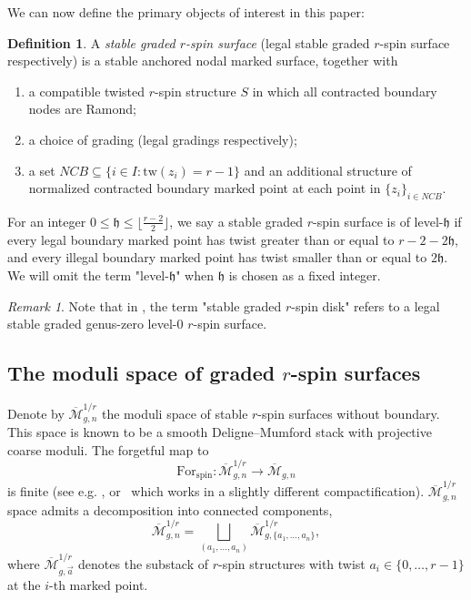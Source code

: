 \documentclass[11pt,a4paper]{article}
\theoremstyle{definition}
\newtheorem{definition}[dummy]{Definition}
\theoremstyle{remark}
\newtheorem{rmk}[dummy]{Remark}
\newcommand{\tw}{\text{tw}}
\numberwithin{equation}{section}
\def\Mbar{{\overline{\mathcal M}}}
\def\h{{\mathfrak h}}
\begin{document}
We can now define the primary objects of interest in this paper:

\begin{definition}
\label{def graded rspin surface}
A \textit{stable graded $r$-spin surface} (legal stable graded $r$-spin surface respectively) is a stable anchored nodal marked surface, together with
\begin{enumerate}
\item a compatible twisted $r$-spin structure $S$ in which all contracted boundary nodes are Ramond;
\item a choice of grading (legal gradings respectively);

\item a set $NCB\subseteq \{i\in I\colon \tw(z_i)=r-1\}$ and an additional structure of normalized contracted boundary marked point at each point in $\{z_i\}_{i\in NCB}$.


\end{enumerate}
For an integer $0\le\h\le \lfloor \frac{r-2}{2}\rfloor$, we say a stable graded $r$-spin surface is of level-$\h$ if every legal boundary marked point has twist greater than or equal to $r-2-2\h$, and every illegal boundary marked point has twist smaller than or equal to $2\h$. We will omit the term "level-$\h$" when $\h$ is chosen as a fixed integer.
\end{definition}

\begin{rmk}
    Note that in \cite{BCT2}, the term "stable graded $r$-spin disk" refers to a legal stable graded genus-zero level-$0$ $r$-spin surface.
\end{rmk}

\subsection{The moduli space of graded $r$-spin surfaces} 
Denote by $\Mbar_{g,n}^{1/r}$ the moduli space of stable $r$-spin surfaces without boundary. This space is known to be a smooth Deligne--Mumford stack with projective coarse moduli. The forgetful map to \[\text{For}_{\text{spin}}:\Mbar_{g,n}^{1/r}\to\Mbar_{g,n}\] is finite (see e.g. \cite{ChiodoStable}, or~\cite{Jarvis} which works in a slightly different compactification). $\Mbar_{g,n}^{1/r}$ space admits a decomposition into connected components,
\[
\Mbar_{g,n}^{1/r} = \bigsqcup_{(a_1, \ldots, a_n)} \Mbar_{g,\{a_1, \ldots, a_n\}}^{1/r},
\]
where $\Mbar_{g,\vec{a}}^{1/r}$ denotes the substack of $r$-spin structures with twist $a_i\in\{0,\ldots,r-1\}$ at the $i$-th marked point.  
\end{document}

